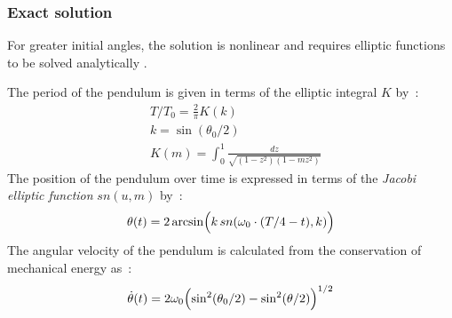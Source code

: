 \subsubsection{Exact solution}
For greater initial angles, the solution is nonlinear and requires elliptic functions to be solved analytically \cite{Borghi2013,Belendez2007}.

The period of the pendulum is given in terms of the elliptic integral $K$ by~:
\begin{subequations}
\begin{alignat}{5}
	&T / T_0  = \frac{2}{\pi}K(k)
	\\[0.5em]
	& k = \sin (\theta_0 / 2)
	\\[0.5em]
	&K(m) = \int_0^1 \frac{dz}{\sqrt{(1-z^2)(1-mz^2)}}
\end{alignat}
\end{subequations}
The position of the pendulum over time is expressed in terms of the \emph{Jacobi elliptic function} $sn(u,m)$ by~:
\begin{equation}
	\theta(t) = 2 \arcsin \Bigl( k \,sn(\omega_0\cdot(T/4 - t), k) \Bigr)
\end{equation}
The angular velocity of the pendulum is calculated from the conservation of mechanical energy as~:
\begin{equation}
	\dot{\theta}(t) = 2 \omega_0 \Bigl( \sin^2 (\theta_0/2) - \sin^2 (\theta/2) \Bigr)^{1/2}
\end{equation}


